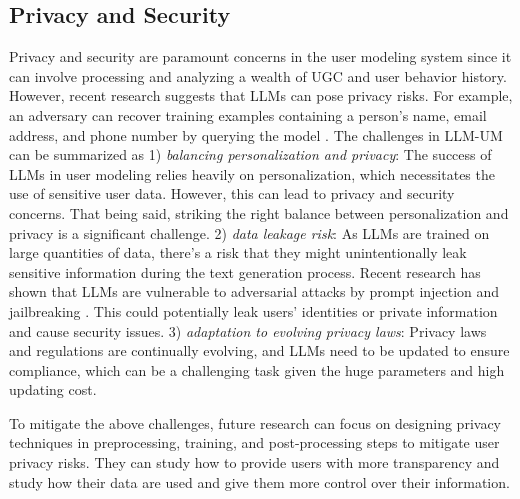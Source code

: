 \documentclass[11pt]{article}
\begin{document}
\subsection{Privacy and Security}
Privacy and security are paramount concerns in the user modeling system since it can involve processing and analyzing a wealth of UGC and user behavior history. However, recent research suggests that LLMs can pose privacy risks. For example, an adversary can recover training examples containing a person’s name, email address, and phone number by querying the model \cite{huang2022large}. The challenges in LLM-UM can be summarized as 1) \textit{balancing personalization and privacy}: The success of LLMs in user modeling relies heavily on personalization, which necessitates the use of sensitive user data. However, this can lead to privacy and security concerns. That being said, striking the right balance between personalization and privacy is a significant challenge. 2) \textit{data leakage risk}: As LLMs are trained on large quantities of data, there's a risk that they might unintentionally leak sensitive information during the text generation process. Recent research has shown that LLMs are vulnerable to adversarial attacks by prompt injection \cite{li2023you} and jailbreaking \cite{rao2023tricking}. This could potentially leak users' identities or private information and cause security issues. 3) \textit{adaptation to evolving privacy laws}: Privacy laws and regulations are continually evolving, and LLMs need to be updated to ensure compliance, which can be a challenging task given the huge parameters and high updating cost.

To mitigate the above challenges, future research can focus on designing privacy techniques in preprocessing, training, and post-processing steps to mitigate user privacy risks. They can study how to provide users with more transparency and study how their data are used and give them more control over their information.


\end{document}
